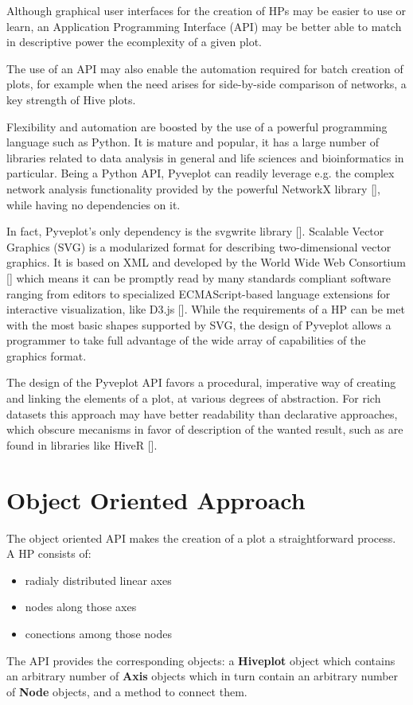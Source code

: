 \documentclass{bioinfo}
\begin{document}
Although graphical user interfaces for the creation of HPs may be
easier to use or learn, an Application Programming Interface (API) may
be better able to match in descriptive power the ecomplexity of a
given plot.

The use of an API may also enable the automation required for batch
creation of plots, for example when the need arises for side-by-side
comparison of networks, a key strength of Hive plots.

Flexibility and automation are boosted by the use of a powerful
programming language such as Python. It is mature and popular, it has
a large number of libraries related to data analysis in general and
life sciences and bioinformatics in particular. Being a Python API,
Pyveplot can readily leverage e.g. the complex network analysis
functionality provided by the powerful NetworkX library
[\cite{hagberg-2008-exploring}], while having no dependencies on it.

In fact, Pyveplot's only dependency is the svgwrite library
[\cite{svgwrite}]. Scalable Vector Graphics (SVG) is a modularized
format for describing two-dimensional vector graphics. It is based on
XML and developed by the World Wide Web Consortium
[\cite{McCormack:11:SVG}] which means it can be promptly read by many
standards compliant software ranging from editors to specialized
ECMAScript-based language extensions for interactive visualization,
like D3.js [\cite{bostock2011d3}]. While the requirements of a HP can
be met with the most basic shapes supported by SVG, the design of
Pyveplot allows a programmer to take full advantage of the wide array
of capabilities of the graphics format.

The design of the Pyveplot API favors a procedural, imperative way of
creating and linking the elements of a plot, at various degrees of
abstraction. For rich datasets this approach may have better
readability than declarative approaches, which obscure mecanisms in
favor of description of the wanted result, such as are found in
libraries like HiveR [\cite{hiveR}].

\section{Object Oriented Approach}

The object oriented API makes the creation of a plot a straightforward
process. A HP consists of:
\begin{itemize}
\item radialy distributed linear axes
\item nodes along those axes
\item conections among those nodes
\end{itemize}
The API provides the corresponding objects: a {\bfseries Hiveplot} object
which contains an arbitrary number of {\bfseries Axis} objects which in
turn contain an arbitrary number of {\bfseries Node} objects, and a method
to connect them.
\end{document}
